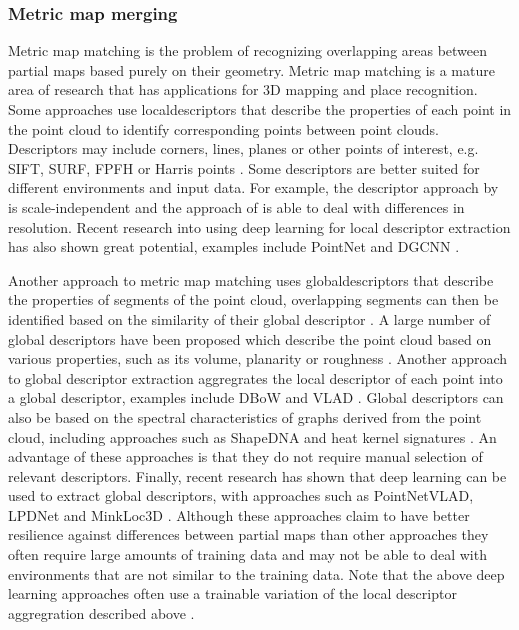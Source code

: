 \subsubsection{Metric map merging}
Metric map matching is the problem of recognizing overlapping areas between partial maps based purely on their geometry. Metric map matching is a mature area of research that has applications for 3D mapping and place recognition.  Some approaches use \gls{localdescriptor}s that describe the properties of each point in the point cloud to identify corresponding points between point clouds. Descriptors may include corners, lines, planes or other points of interest, e.g. SIFT, SURF, FPFH or Harris points \citep{andersone_heterogeneous_2019,rusu_fast_2009}. Some descriptors are better suited for different environments and input data. For example, the descriptor approach by \citet{li_general_2010} is scale-independent and the approach of \citet{yang_fast_2016} is able to deal with differences in resolution. Recent research into using deep learning for local descriptor extraction has also shown great potential, examples include PointNet and DGCNN \citep{qi_pointnet_2017,phan_dgcnn_2018}.

Another approach to metric map matching uses \gls{globaldescriptor}s that describe the properties of segments of the point cloud, overlapping segments can then be identified based on the similarity of their global descriptor \citep{dube_segmatch_2017}. A large number of global descriptors have been proposed which describe the point cloud based on various properties, such as its volume, planarity or roughness \citep{han_comprehensive_2018}. Another approach to global descriptor extraction aggregrates the local descriptor of each point into a global descriptor, examples include DBoW and VLAD \citep{shan_robust_2021,arandjelovic_all_2013}. Global descriptors can also be based on the spectral characteristics of graphs derived from the point cloud, including approaches such as ShapeDNA and heat kernel signatures \citep{reuter_laplacebeltrami_2006,bronstein_scale-invariant_2010}. An advantage of these approaches is that they do not require manual selection of relevant descriptors. Finally, recent research has shown that deep learning can be used to extract global descriptors, with approaches such as PointNetVLAD, LPDNet and MinkLoc3D \citep{uy_pointnetvlad_2018-1,liu_lpd-net_2019,komorowski_minkloc3d_2021}. Although these approaches claim to have better resilience against differences between partial maps than other approaches they often require large amounts of training data and may not be able to deal with environments that are not similar to the training data. Note that the above deep learning approaches often use a trainable variation of the local descriptor aggregration described above \citep{arandjelovic_netvlad_2016}. 

